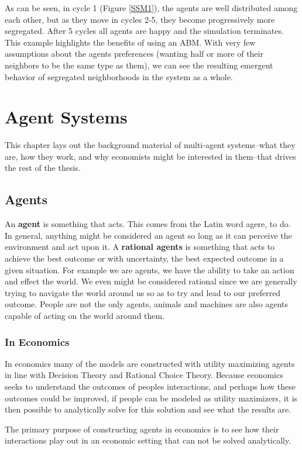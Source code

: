 \documentclass[12pt,twoside]{reedthesis}
\begin{document}
As can be seen, in cycle 1 (Figure \ref{SSM1}), the agents are well distributed among each other, but as they move in cycles 2-5, they become progressively more segregated. After 5 cycles all agents are happy and the simulation terminates. This example highlights the benefits of using an ABM. With very few assumptions about the agents preferences (wanting half or more of their neighbors to be the same type as them), we can see the resulting emergent behavior of segregated neighborhoods in the system as a whole. 


	
\chapter{Agent Systems}
   	This chapter lays out the background material of multi-agent systems--what they are, how they work, and why economists might be interested in them--that drives the rest of the thesis. 
	
\section{Agents}
An \textbf{agent} is something that acts. This comes from the Latin word agere, to do. In general, anything might be considered an agent so long as it can perceive the environment and act upon it. A \textbf{rational agents} is something that acts to achieve the best outcome or with uncertainty, the best expected outcome in a given situation. For example we are agents, we have the ability to take an action and effect the world. We even might be considered rational since we are generally trying to navigate the world around us so as to try and lead to our preferred outcome. People are not the only agents, animals and machines are also agents capable of acting on the world around them. 

\subsection{In Economics}
In economics many of the models are constructed with utility maximizing agents in line with Decision Theory and Rational Choice Theory. Because economics seeks to understand the outcomes of peoples interactions, and perhaps how these outcomes could be improved, if people can be modeled as utility maximizers, it is then possible to analytically solve for this solution and see what the results are. 

The primary purpose of constructing agents in economics is to see how their interactions play out in an economic setting that can not be solved analytically.  
 
\end{document}

